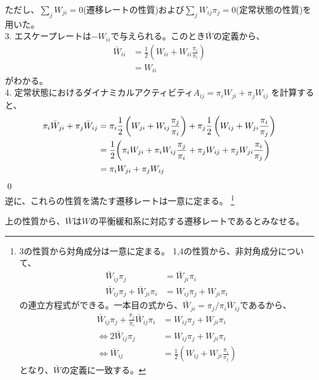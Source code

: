 \documentclass[a4paper,11pt]{jsarticle}
\numberwithin{equation}{section}
\begin{document}
ただし、$\sum_j W_{ji} = 0$(遷移レートの性質)および$\sum_j W_{ij} \pi_j = 0$(定常状態の性質)を用いた。\\
3.
エスケープレートは$-W_{ii}$で与えられる。このとき$\bar{W}$の定義から、
\begin{align}
    \bar{W}_{ii} &= \frac{1}{2} \left(W_{ii} + W_{ii} \frac{\pi_i}{\pi_i}\right)\\
    &= W_{ii}
\end{align}
がわかる。\\
4.
定常状態におけるダイナミカルアクティビティ$A_{ij} = \pi_i W_{ji} + \pi_j W_{ij}$
を計算すると、
\begin{align}
    \pi_i \bar{W}_{ji} + \pi_j \bar{W}_{ij}
    &= \pi_i \frac{1}{2} \left(W_{ji} + W_{ij} \frac{\pi_j}{\pi_i}\right) + \pi_j \frac{1}{2} \left(W_{ij} + W_{ji} \frac{\pi_i}{\pi_j}\right)\\
    &= \frac{1}{2} \qty(\pi_i W_{ji} + \pi_i W_{ij} \frac{\pi_j}{\pi_i} + \pi_j W_{ij} + \pi_j W_{ji} \frac{\pi_i}{\pi_j})\\
    &= \pi_i W_{ji} + \pi_j W_{ij}
\end{align}
\qed\\

逆に、これらの性質を満たす遷移レートは一意に定まる。
\footnote{
    3の性質から対角成分は一意に定まる。
    1,4の性質から、非対角成分について、
    \begin{align}
        \bar{W}_{ij} \pi_j &= \bar{W}_{ji} \pi_i\\
        \bar{W}_{ij} \pi_j + \bar{W}_{ji} \pi_i &= W_{ij} \pi_j + W_{ji} \pi_i
    \end{align}
    の連立方程式ができる。一本目の式から、$\bar{W}_{ji} = \pi_j/\pi_i \bar{W}_{ij}$であるから、
    \begin{align}
        \bar{W}_{ij} \pi_j + \frac{\pi_j}{\pi_i} \bar{W}_{ij} \pi_i &= W_{ij} \pi_j + W_{ji} \pi_i\\
       \Leftrightarrow 2 \bar{W}_{ij} \pi_j &= W_{ij} \pi_j + W_{ji} \pi_i\\
        \Leftrightarrow \bar{W}_{ij} &= \frac{1}{2} \left(W_{ij} + W_{ji} \frac{\pi_i}{\pi_j}\right)
    \end{align}
    となり、$\bar{W}$の定義に一致する。
}

上の性質から、$\bar{W}$は$W$の平衡緩和系に対応する遷移レートであるとみなせる。
\end{document}
